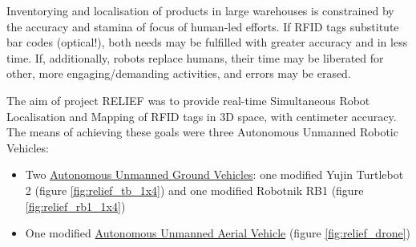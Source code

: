 Inventorying and localisation of products in large warehouses is constrained by
the accuracy and stamina of focus of human-led efforts. If RFID tags substitute
bar codes (optical!), both needs may be fulfilled with greater accuracy and in
less time. If, additionally, robots replace humans, their time may be liberated
for other, more engaging/demanding activities, and errors may be erased.

The aim of project RELIEF was to provide real-time Simultaneous Robot
Localisation and Mapping of RFID tags in 3D space, with centimeter accuracy. The
means of achieving these goals were three Autonomous Unmanned Robotic Vehicles:

\begin{itemize}
  \item Two
        \href{https://www.youtube.com/watch?v=bo4lMI640DY}{Autonomous Unmanned Ground Vehicles}:
        one modified Yujin Turtlebot 2 (figure \ref{fig:relief_tb_1x4}) and one
        modified Robotnik RB1 (figure \ref{fig:relief_rb1_1x4})
  \item One modified
        \href{https://www.youtube.com/watch?v=9YpBIaO4tgY}{Autonomous Unmanned Aerial Vehicle}
        (figure \ref{fig:relief_drone})
\end{itemize}


